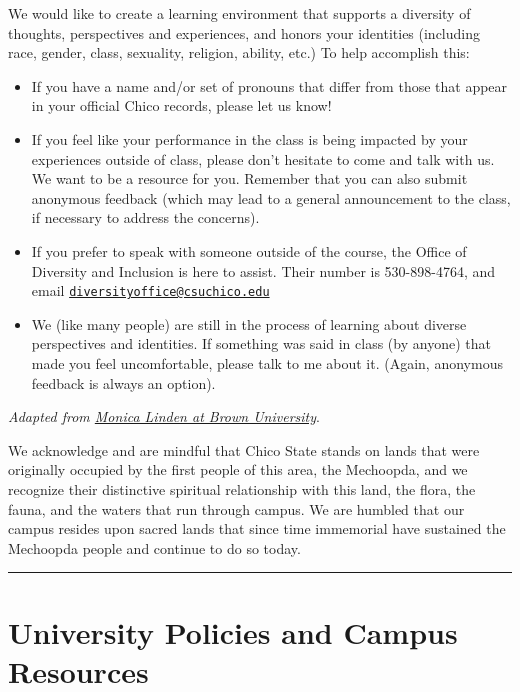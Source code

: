 \documentclass[
  11pt,
]{article}
\providecommand{\tightlist}{%
  \setlength{\itemsep}{0pt}\setlength{\parskip}{0pt}}
\begin{document}
We would like to create a learning environment that supports a diversity
of thoughts, perspectives and experiences, and honors your identities
(including race, gender, class, sexuality, religion, ability, etc.) To
help accomplish this:

\begin{itemize}
\tightlist
\item
  If you have a name and/or set of pronouns that differ from those that
  appear in your official Chico records, please let us know!
\item
  If you feel like your performance in the class is being impacted by
  your experiences outside of class, please don't hesitate to come and
  talk with us. We want to be a resource for you. Remember that you can
  also submit anonymous feedback (which may lead to a general
  announcement to the class, if necessary to address the concerns).
\item
  If you prefer to speak with someone outside of the course, the Office
  of Diversity and Inclusion is here to assist. Their number is
  530-898-4764, and email
  \href{mailto:diversityoffice@csuchico.edu}{\nolinkurl{diversityoffice@csuchico.edu}}
\item
  We (like many people) are still in the process of learning about
  diverse perspectives and identities. If something was said in class
  (by anyone) that made you feel uncomfortable, please talk to me about
  it. (Again, anonymous feedback is always an option).
\end{itemize}

\emph{Adapted from
\href{https://www.brown.edu/sheridan/teaching-learning-resources/inclusive-teaching/statements}{Monica
Linden at Brown University}}.

We acknowledge and are mindful that Chico State stands on lands that
were originally occupied by the first people of this area, the
Mechoopda, and we recognize their distinctive spiritual relationship
with this land, the flora, the fauna, and the waters that run through
campus. We are humbled that our campus resides upon sacred lands that
since time immemorial have sustained the Mechoopda people and continue
to do so today.

\begin{center}\rule{0.5\linewidth}{0.5pt}\end{center}

\section{University Policies and Campus
Resources}\label{university-policies-and-campus-resources}
\end{document}
